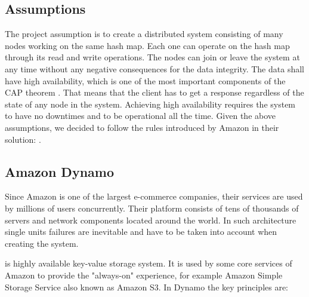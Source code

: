     \subsection{Assumptions}
        The project assumption is to create a distributed system consisting of many nodes working on the same hash map.
        Each one can operate on the hash map through its read and write operations.
        The nodes can join or leave the system at any time without any negative consequences for the data integrity.
        The data shall have high availability, which is one of the most important components of the CAP theorem \cite{CAP}.
        That means that the client has to get a response regardless of the state of any node in the system.
        Achieving high availability requires the system to have no downtimes and to be operational all the time.
        Given the above assumptions, we decided to follow the rules introduced by Amazon in their solution: \Dynamo \cite{AmazonDynamo}.
    
    \subsection{Amazon Dynamo}
        Since Amazon is one of the largest e-commerce companies, their services are used by millions of users concurrently. 
        Their platform consists of tens of thousands of servers and network components located around the world. 
        In such architecture single units failures are inevitable and have to be taken into account when creating the system.
        
        \Dynamo is highly available key-value storage system.
        It is used by some core services of Amazon to provide the "always-on" experience, for example Amazon Simple Storage Service \cite{AmazonS3} also known as Amazon S3.
        In Dynamo the key principles are:
        
